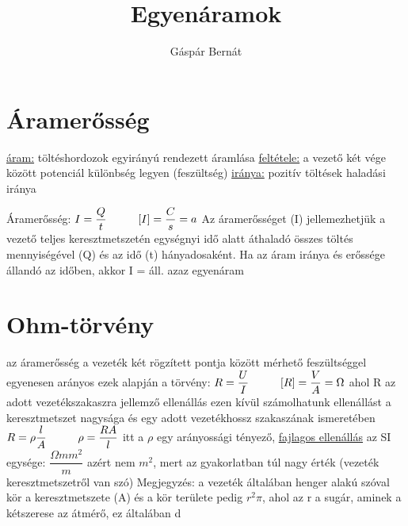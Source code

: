 \documentclass [12pt,a4paper] {article}
\author{Gáspár Bernát}
\title{Egyenáramok}
\begin{document}
\maketitle
\section{Áramerősség}
\underline{áram:} töltéshordozok egyirányú rendezett áramlása \newline
\underline{feltétele:} a vezető két vége között potenciál különbség legyen (feszültség) \newline
\underline{iránya:} pozitív töltések haladási iránya \newline\newline

Áramerősség: $I = \dfrac{Q}{t} \hspace{10mm} [I] = \dfrac{C}{s} = a$ \newline\newline
Az áramerősséget (I) jellemezhetjük a vezető teljes keresztmetszetén egységnyi idő alatt áthaladó összes töltés mennyiségével (Q) és az idő (t) hányadosaként. \newline
Ha az áram iránya és erőssége állandó az időben, akkor I = áll. azaz egyenáram

\section{Ohm-törvény}
az áramerősség a vezeték két rögzített pontja között mérhető feszültséggel egyenesen arányos\newline\newline
ezek alapján a törvény: $R = \dfrac{U}{I} \hspace{10mm} [R] = \dfrac{V}{A} = \Omega$ ahol R az adott vezetékszakaszra jellemző ellenállás \newline \newline
ezen kívül számolhatunk ellenállást a keresztmetszet nagysága és egy adott vezetékhossz szakaszának ismeretében \newline\newline
$R = \rho\dfrac{l}{A} {\hspace{10mm} \rho = \dfrac{RA}{l}}$ itt a $\rho$ egy arányossági tényező, \underline{fajlagos ellenállás}\newline
az SI egysége: $\dfrac{\Omega mm^2}{m}$ azért nem $m^2$, mert az gyakorlatban túl nagy érték (vezeték keresztmetszetről van szó)\newline\newline
Megjegyzés: a vezeték általában henger alakú szóval kör a keresztmetszete (A) és a kör területe pedig $r^2\pi$, ahol az r a sugár, aminek a kétszerese az átmérő, ez általában d
\end{document}
